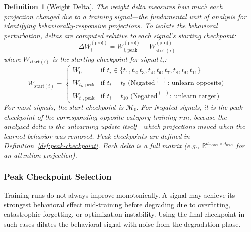\documentclass[11pt]{article}
\newtheorem{definition}{Definition}[section]
\begin{document}
\begin{definition}[Weight Delta]
\label{def:weight-delta}
The weight delta measures how much each projection changed due to a training signal---the fundamental unit of analysis for identifying behaviorally-responsive projections. To isolate the behavioral perturbation, deltas are computed relative to each signal's starting checkpoint:
\begin{equation}
\Delta W_i^{(\text{proj})} = W_{i,\text{peak}}^{(\text{proj})} - W_{\text{start}(i)}^{(\text{proj})}
\end{equation}
where $W_{\text{start}(i)}$ is the starting checkpoint for signal $t_i$:
\begin{equation}
W_{\text{start}(i)} = \begin{cases}
W_0 & \text{if } t_i \in \{t_1, t_2, t_3, t_4, t_6, t_7, t_8, t_9, t_{11}\} \\
W_{t_6,\text{peak}} & \text{if } t_i = t_5 \;\text{(Negated}^{(-)}\text{: unlearn opposite)} \\
W_{t_1,\text{peak}} & \text{if } t_i = t_{10} \;\text{(Negated}^{(+)}\text{: unlearn target)}
\end{cases}
\end{equation}
For most signals, the start checkpoint is $\mathcal{M}_0$. For Negated signals, it is the peak checkpoint of the corresponding opposite-category training run, because the analyzed delta is the unlearning update itself---which projections moved when the learned behavior was removed. Peak checkpoints are defined in Definition~\ref{def:peak-checkpoint}. Each delta is a full matrix (e.g., $\mathbb{R}^{d_{\text{model}} \times d_{\text{head}}}$ for an attention projection).
\end{definition}

\subsubsection*{Peak Checkpoint Selection}
\label{sec:peak-checkpoint}

Training runs do not always improve monotonically. A signal may achieve its strongest behavioral effect mid-training before degrading due to overfitting, catastrophic forgetting, or optimization instability. Using the final checkpoint in such cases dilutes the behavioral signal with noise from the degradation phase.
\end{document}
